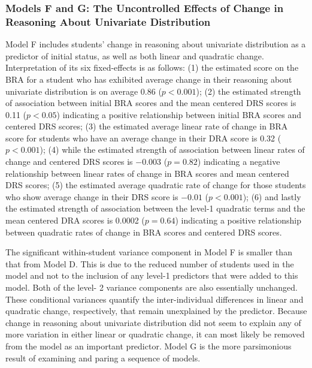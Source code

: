 \documentclass[11pt]{umnthesis}
\begin{document}
\hypertarget{models-f-and-g-the-uncontrolled-effects-of-change-in-reasoning-about-univariate-distribution}{%
\subsubsection*{Models F and G: The Uncontrolled Effects of Change in Reasoning About Univariate Distribution}\label{models-f-and-g-the-uncontrolled-effects-of-change-in-reasoning-about-univariate-distribution}}

Model F includes students' change in reasoning about univariate distribution as a predictor of initial status, as well as both linear and quadratic change. Interpretation of its six fixed-effects is as follows: (1) the estimated score on the BRA for a student who has exhibited average change in their reasoning about univariate distribution is on average 0.86 (\(p<0.001\)); (2) the estimated strength of association between initial BRA scores and the mean centered DRS scores is 0.11 (\(p<0.05\)) indicating a positive relationship between initial BRA scores and centered DRS scores; (3) the estimated average linear rate of change in BRA score for students who have an average change in their DRA score is 0.32 (\(p<0.001\)); (4) while the estimated strength of association between linear rates of change and centered DRS scores is \(-0.003\) (\(p=0.82\)) indicating a negative relationship between linear rates of change in BRA scores and mean centered DRS scores; (5) the estimated average quadratic rate of change for those students who show average change in their DRS score is \(-0.01\) (\(p<0.001\)); (6) and lastly the estimated strength of association between the level-1 quadratic terms and the mean centered DRA scores is 0.0002 (\(p=0.64\)) indicating a positive relationship between quadratic rates of change in BRA scores and centered DRS scores.

The significant within-student variance component in Model F is smaller than that from Model D. This is due to the reduced number of students used in the model and not to the inclusion of any level-1 predictors that were added to this model. Both of the level- 2 variance components are also essentially unchanged. These conditional variances quantify the inter-individual differences in linear and quadratic change, respectively, that remain unexplained by the predictor. Because change in reasoning about univariate distribution did not seem to explain any of more variation in either linear or quadratic change, it can most likely be removed from the model as an important predictor. Model G is the more parsimonious result of examining and paring a sequence of models.
\end{document}
